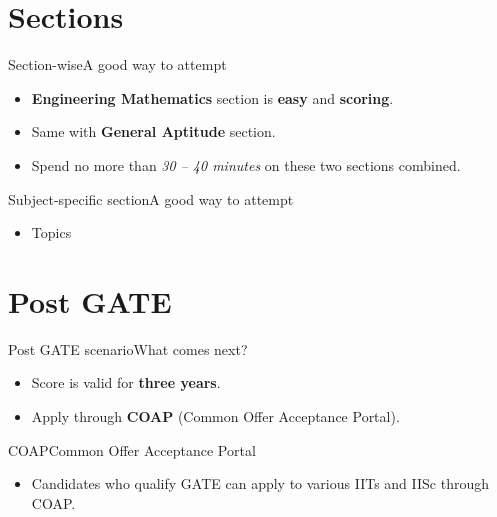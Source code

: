 \documentclass[handout]{beamer}
\begin{document}
\section{Sections}
\begin{frame}{Section-wise}{A good way to attempt}
    \begin{itemize}
        \item \textbf{Engineering Mathematics} section is \textbf{easy} and \textbf{scoring}.
        \item Same with \textbf{General Aptitude} section.
        \item Spend no more than \emph{30 -- 40 minutes} on these two sections combined.
    \end{itemize}
\end{frame}

\begin{frame}{Subject-specific section}{A good way to attempt}
    \begin{itemize}
        \item Topics
    \end{itemize}
\end{frame}

\section{Post GATE}
\begin{frame}{Post GATE scenario}{What comes next?}
    \begin{itemize}
        \item Score is valid for \textbf{three years}.
        \item Apply through \textbf{COAP} (Common Offer Acceptance Portal).
    \end{itemize}
\end{frame}

\begin{frame}{COAP}{Common Offer Acceptance Portal}
    \begin{itemize}
        \item Candidates who qualify GATE can apply to various IITs and IISc through COAP.
    \end{itemize}
\end{frame}
\end{document}
